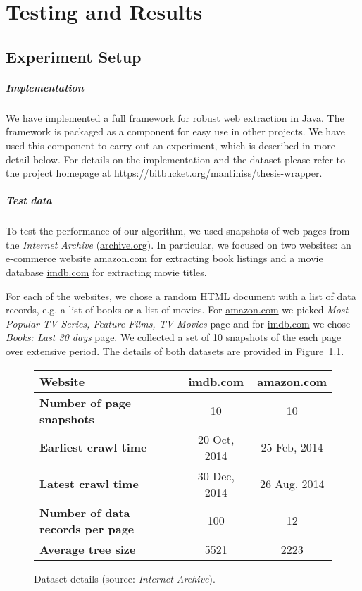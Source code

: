 \chapter{Testing and Results}


\section{Experiment Setup}

\paragraph{Implementation} We have implemented a full framework for robust web extraction in Java. The framework is packaged as a component for easy use in other projects. We have used this component to carry out an experiment, which is described in more detail below. For details on the implementation and the dataset please refer to the project homepage at \url{https://bitbucket.org/mantiniss/thesis-wrapper}.

\paragraph{Test data} To test the performance of our algorithm, we used snapshots of web pages from the \emph{Internet Archive} (\url{archive.org}). In particular, we focused on two websites: an e-commerce website \url{amazon.com} for extracting book listings and a movie database \url{imdb.com} for extracting movie titles.

For each of the websites, we chose a random HTML document with a list of data records, e.g. a list of books or a list of movies. For \url{amazon.com} we picked \emph{Most Popular TV Series, Feature Films, TV Movies} page and for \url{imdb.com} we chose \emph{Books: Last 30 days} page. We collected a set of 10 snapshots of the each page over extensive period. The details of both datasets are provided in Figure~\ref{tbl:dataset}.

\begin{figure}[h]
	\centering
    \begin{tabularx}{\textwidth}{ | X | c | c | }
		\hline
		\textbf{Website} & \url{imdb.com} & \url{amazon.com} \\
		\hline
		\textbf{Number of page snapshots} & 10 & 10 \\
		\hline
		\textbf{Earliest crawl time} & 20 Oct, 2014 & 25 Feb, 2014 \\
		\hline
		\textbf{Latest crawl time} & 30 Dec, 2014 & 26 Aug, 2014 \\
		\hline
		\textbf{Number of data records per page} & 100 & 12 \\
		\hline
		\textbf{Average tree size} & 5521 & 2223 \\
		\hline
    \end{tabularx}
	\caption{Dataset details (source: \emph{Internet Archive}).}
	\label{tbl:dataset}
\end{figure}


